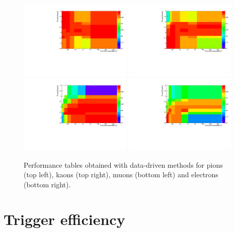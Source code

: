 \begin{figure}[h!]
\centering
\includegraphics[width=0.48\textwidth]{RKst/figs/pid_Pi.pdf}
\includegraphics[width=0.48\textwidth]{RKst/figs/pid_K.pdf}
\includegraphics[width=0.48\textwidth]{RKst/figs/pid_Mu.pdf}
\includegraphics[width=0.48\textwidth]{RKst/figs/pid_e.pdf}
\caption{Performance tables obtained with data-driven methods
for pions (top left), kaons (top right), muons (bottom left) and electrons (bottom right).}
\label{fig:pid_perf_hist}
\end{figure}


\section{Trigger efficiency}
\label{sec:RKst_trigger_eff}

